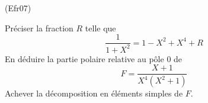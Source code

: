 \begin{tiny}(Efr07)\end{tiny} Préciser la fraction $R$ telle que
\begin{displaymath}
 \frac{1}{1+X^2}= 1-X^2+X^4+R
\end{displaymath}
En déduire la partie polaire relative au pôle $0$ de 
\begin{displaymath}
 F=\frac{X+1}{X^4(X^2+1)}
\end{displaymath}
Achever la décomposition en éléments simples de $F$.